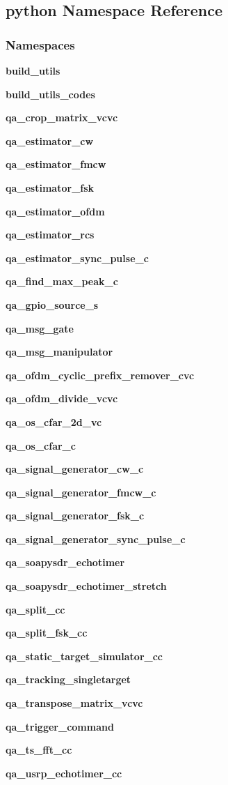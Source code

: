 \subsection{python Namespace Reference}
\label{namespacepython}
\subsubsection*{Namespaces}
\begin{DoxyCompactItemize}
\item 
 {\bf build\+\_\+utils}
\item 
 {\bf build\+\_\+utils\+\_\+codes}
\item 
 {\bf qa\+\_\+crop\+\_\+matrix\+\_\+vcvc}
\item 
 {\bf qa\+\_\+estimator\+\_\+cw}
\item 
 {\bf qa\+\_\+estimator\+\_\+fmcw}
\item 
 {\bf qa\+\_\+estimator\+\_\+fsk}
\item 
 {\bf qa\+\_\+estimator\+\_\+ofdm}
\item 
 {\bf qa\+\_\+estimator\+\_\+rcs}
\item 
 {\bf qa\+\_\+estimator\+\_\+sync\+\_\+pulse\+\_\+c}
\item 
 {\bf qa\+\_\+find\+\_\+max\+\_\+peak\+\_\+c}
\item 
 {\bf qa\+\_\+gpio\+\_\+source\+\_\+s}
\item 
 {\bf qa\+\_\+msg\+\_\+gate}
\item 
 {\bf qa\+\_\+msg\+\_\+manipulator}
\item 
 {\bf qa\+\_\+ofdm\+\_\+cyclic\+\_\+prefix\+\_\+remover\+\_\+cvc}
\item 
 {\bf qa\+\_\+ofdm\+\_\+divide\+\_\+vcvc}
\item 
 {\bf qa\+\_\+os\+\_\+cfar\+\_\+2d\+\_\+vc}
\item 
 {\bf qa\+\_\+os\+\_\+cfar\+\_\+c}
\item 
 {\bf qa\+\_\+signal\+\_\+generator\+\_\+cw\+\_\+c}
\item 
 {\bf qa\+\_\+signal\+\_\+generator\+\_\+fmcw\+\_\+c}
\item 
 {\bf qa\+\_\+signal\+\_\+generator\+\_\+fsk\+\_\+c}
\item 
 {\bf qa\+\_\+signal\+\_\+generator\+\_\+sync\+\_\+pulse\+\_\+c}
\item 
 {\bf qa\+\_\+soapysdr\+\_\+echotimer}
\item 
 {\bf qa\+\_\+soapysdr\+\_\+echotimer\+\_\+stretch}
\item 
 {\bf qa\+\_\+split\+\_\+cc}
\item 
 {\bf qa\+\_\+split\+\_\+fsk\+\_\+cc}
\item 
 {\bf qa\+\_\+static\+\_\+target\+\_\+simulator\+\_\+cc}
\item 
 {\bf qa\+\_\+tracking\+\_\+singletarget}
\item 
 {\bf qa\+\_\+transpose\+\_\+matrix\+\_\+vcvc}
\item 
 {\bf qa\+\_\+trigger\+\_\+command}
\item 
 {\bf qa\+\_\+ts\+\_\+fft\+\_\+cc}
\item 
 {\bf qa\+\_\+usrp\+\_\+echotimer\+\_\+cc}
\end{DoxyCompactItemize}
